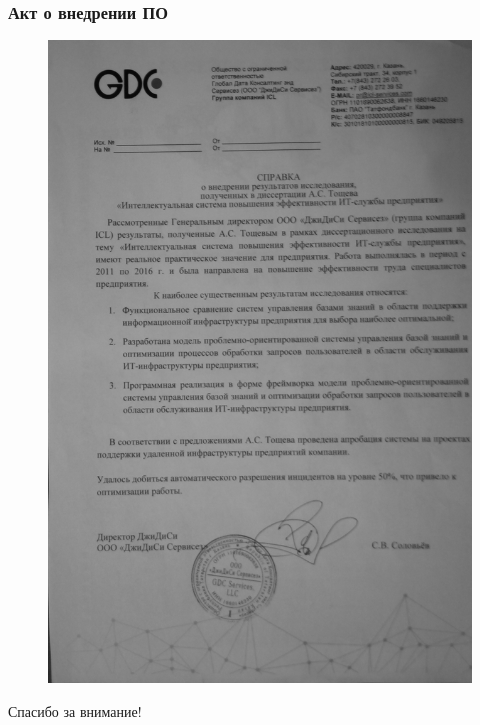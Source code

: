 \documentclass[14pt]{beamer}
\begin{document}
\begin{frame}
\frametitle{Акт о внедрении ПО}
\begin{figure} [h] 
  \center
  \includegraphics [scale=0.05] {ActVnedr} 
  \label{img:ActVnedr}  
\end{figure}



\end{frame}


\begin{frame}
\begin{center}
Спасибо за внимание!
\end{center}
\end{frame}

\end{document}
